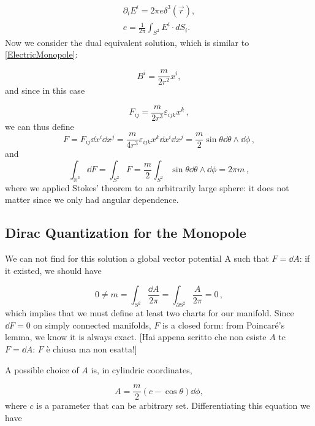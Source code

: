 \documentclass[main.tex]{subfiles}
\begin{document}
\begin{align}
\partial_i E^i=2\pi e \delta^3(\vec r),\\
e=\frac{1}{2\pi}\int_{S^2} E^i \cdot d S_i.
\end{align}
Now we consider the dual equivalent solution, which is similar to \eqref{ElectricMonopole}:

\begin{equation}\label{MagneticMonopole}
B^i=\frac{m}{2r^2}x^i,
\end{equation}
and since in this case

\begin{equation}
F_{ij}=\frac{m}{2r^3}\varepsilon_{ijk}x^k\,,
\end{equation}
%
we can thus define
%
\begin{equation}
F=F_{ij}\dd{x^i}\dd{x^j}=\frac{m}{4r^3}\varepsilon_{ijk}x^k\dd{x^i}\dd{x^j}=\frac{m}{2}\sin\theta \dd{\theta}\wedge \dd{\phi}\,,
\end{equation}
%
and
%
\begin{equation}
\int_{\mathbb R^3} \dd{F} = \int_{S^2} F=\frac{m}{2}\int_{S^2}\sin\theta \dd{\theta}\wedge \dd{\phi}=2\pi m\,,
\end{equation}
%
where we applied Stokes' theorem to an arbitrarily large sphere: it does not matter since we only had angular dependence.
\subsection{Dirac Quantization for the Monopole}
We can not find for this solution a global vector potential A such that $F=\dd{A}$: if it existed, we should have

\begin{equation}
0\neq m=\int_{S^2}\frac{\dd{A}}{2\pi}=\int_{\partial S^2}\frac{A}{2\pi}=0\,,
\end{equation}
%
which implies that we must define at least two charts for our manifold.
Since $\dd{F}=0$ on simply connected manifolds, $F$ is a closed form: from Poincaré's lemma, we know it is always exact. [Hai appena scritto che non esiste $A$ tc $F = \dd{A}$: $F$ è chiusa ma non esatta!]

A possible choice of $A$ is, in cylindric coordinates,

\begin{equation}
A=\frac{m}{2}\left(c-\cos\theta\right)\dd{\phi},
\end{equation}
where $c$ is a parameter that can be arbitrary set. Differentiating this equation we have
\end{document}
